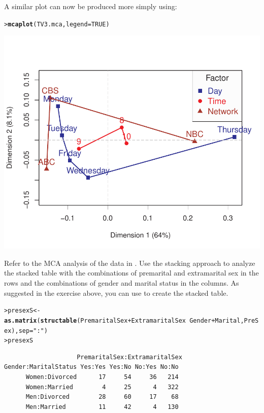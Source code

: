 \documentclass[10pt]{report}\usepackage[]{graphicx}\usepackage[]{color}
\makeatletter
\newcommand{\hlnum}[1]{\textcolor[rgb]{0.686,0.059,0.569}{#1}}%
\newcommand{\hlstr}[1]{\textcolor[rgb]{0.192,0.494,0.8}{#1}}%
\newcommand{\hlopt}[1]{\textcolor[rgb]{0,0,0}{#1}}%
\newcommand{\hlstd}[1]{\textcolor[rgb]{0.345,0.345,0.345}{#1}}%
\newcommand{\hlkwb}[1]{\textcolor[rgb]{0.69,0.353,0.396}{#1}}%
\newcommand{\hlkwc}[1]{\textcolor[rgb]{0.333,0.667,0.333}{#1}}%
\newcommand{\hlkwd}[1]{\textcolor[rgb]{0.737,0.353,0.396}{\textbf{#1}}}%
\newenvironment{kframe}{%
 \def\at@end@of@kframe{}%
 \ifinner\ifhmode%
  \def\at@end@of@kframe{\end{minipage}}%
  \begin{minipage}{\columnwidth}%
 \fi\fi%
 \def\FrameCommand##1{\hskip\@totalleftmargin \hskip-\fboxsep
 \colorbox{shadecolor}{##1}\hskip-\fboxsep
     \hskip-\linewidth \hskip-\@totalleftmargin \hskip\columnwidth}%
 \MakeFramed {\advance\hsize-\width
   \@totalleftmargin\z@ \linewidth\hsize
   \@setminipage}}%
 {\par\unskip\endMakeFramed%
 \at@end@of@kframe}
\newenvironment{knitrout}{}{} %
\renewenvironment{knitrout}{\small\renewcommand{\baselinestretch}{.85}}{} %
\makeatother
\begin{document}
\begin{Exercises}
\begin{enumerate*}
\begin{ans}
\begin{knitrout}
\end{knitrout}
    \end{ans}
    A similar plot can now be produced more simply using:
\begin{knitrout}\footnotesize
{}\color{fgcolor}\begin{kframe}
\begin{alltt}
\hlstd{> }\hlkwd{mcaplot}\hlstd{(TV3.mca,} \hlkwc{legend}\hlstd{=}\hlnum{TRUE}\hlstd{)}
\end{alltt}
\end{kframe}

\centerline{\includegraphics[width=.5\textwidth]{soln/fig/ex6_9c3-1} }



\end{knitrout}
    
      
  \end{enumerate*}

 \exercise\label{lab:presex} Refer to the MCA analysis of the  data in .
   	  Use the stacking approach to analyze the stacked table with the combinations of 
  	  premarital and extramarital sex in the rows and the combinations of gender and marital status
  	  in the columns.  As suggested in the exercise above, you can use 
  	   to create the stacked table.
  	  
\begin{knitrout}\footnotesize
{}\color{fgcolor}\begin{kframe}
\begin{alltt}
\hlstd{> }\hlstd{presexS}\hlkwb{<-} \hlkwd{as.matrix}\hlstd{(}\hlkwd{structable}\hlstd{(PremaritalSex} \hlopt{+} \hlstd{ExtramaritalSex} \hlopt{~} \hlstd{Gender} \hlopt{+} \hlstd{Marital, PreSex),} \hlkwc{sep}\hlstd{=}\hlstr{":"}\hlstd{)}
\hlstd{> }\hlstd{presexS}
\end{alltt}
\begin{verbatim}
                    PremaritalSex:ExtramaritalSex
Gender:MaritalStatus Yes:Yes Yes:No No:Yes No:No
      Women:Divorced      17     54     36   214
      Women:Married        4     25      4   322
      Men:Divorced        28     60     17    68
      Men:Married         11     42      4   130
\end{verbatim}
\end{kframe}
\end{knitrout}


\end{Exercises}
\end{document}
